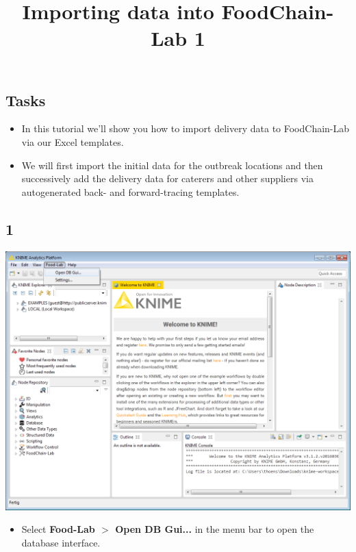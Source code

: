 \documentclass{beamer}
\title{Importing data into FoodChain-Lab 1}
\date{}
\begin{document}
\maketitle

\section{ }

\subsection{Tasks}
\begin{frame}
	\begin{itemize}
		\item In this tutorial we'll show you how to import delivery data to FoodChain-Lab via our Excel templates.
		\item We will first import the initial data for the outbreak locations and then successively add the delivery data for caterers and other suppliers via autogenerated back- and forward-tracing templates.
	\end{itemize}
\end{frame}
 
\subsection{1}
\begin{frame}
	\begin{center}
  		\includegraphics[height=0.6\textheight]{1.png}
	\end{center}
	\begin{itemize}
		\item Select \textbf{Food-Lab $>$ Open DB Gui...} in the menu bar to open the database interface.
	\end{itemize}
\end{frame}
\end{document}
